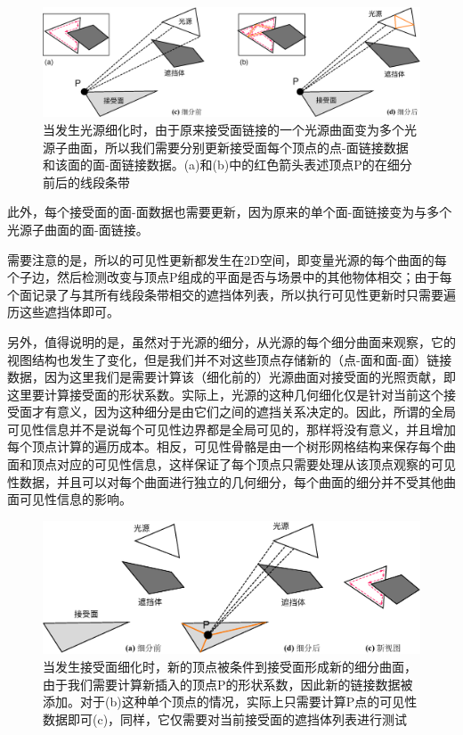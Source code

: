 \begin{figure}
\begin{fullwidth}
\includegraphics[width=\thewidth]{figures/r/source-refinement}
	\caption{当发生光源细化时，由于原来接受面链接的一个光源曲面变为多个光源子曲面，所以我们需要分别更新接受面每个顶点的点-面链接数据和该面的面-面链接数据。(a)和(b)中的红色箭头表述顶点P的在细分前后的线段条带}
	\label{f:r-source-refinement}
\end{fullwidth}
\end{figure}

此外，每个接受面的面-面数据也需要更新，因为原来的单个面-面链接变为与多个光源子曲面的面-面链接。

需要注意的是，所以的可见性更新都发生在2D空间，即变量光源的每个曲面的每个子边，然后检测改变与顶点P组成的平面是否与场景中的其他物体相交；由于每个面记录了与其所有线段条带相交的遮挡体列表，所以执行可见性更新时只需要遍历这些遮挡体即可。

另外，值得说明的是，虽然对于光源的细分，从光源的每个细分曲面来观察，它的视图结构也发生了变化，但是我们并不对这些顶点存储新的（点-面和面-面）链接数据，因为这里我们是需要计算该（细化前的）光源曲面对接受面的光照贡献，即这里要计算接受面的形状系数。实际上，光源的这种几何细化仅是针对当前这个接受面才有意义，因为这种细分是由它们之间的遮挡关系决定的。因此，所谓的全局可见性信息并不是说每个可见性边界都是全局可见的，那样将没有意义，并且增加每个顶点计算的遍历成本。相反，可见性骨骼是由一个树形网格结构来保存每个曲面和顶点对应的可见性信息，这样保证了每个顶点只需要处理从该顶点观察的可见性数据，并且可以对每个曲面进行独立的几何细分，每个曲面的细分并不受其他曲面可见性信息的影响。

\begin{figure}\includegraphics[width=1.\textwidth]{figures/r/receiver-refinement}
	\caption{当发生接受面细化时，新的顶点被条件到接受面形成新的细分曲面，由于我们需要计算新插入的顶点P的形状系数，因此新的链接数据被添加。对于(b)这种单个顶点的情况，实际上只需要计算P点的可见性数据即可(c)，同样，它仅需要对当前接受面的遮挡体列表进行测试}
	\label{f:r-receiver-refinement}
\end{figure}

